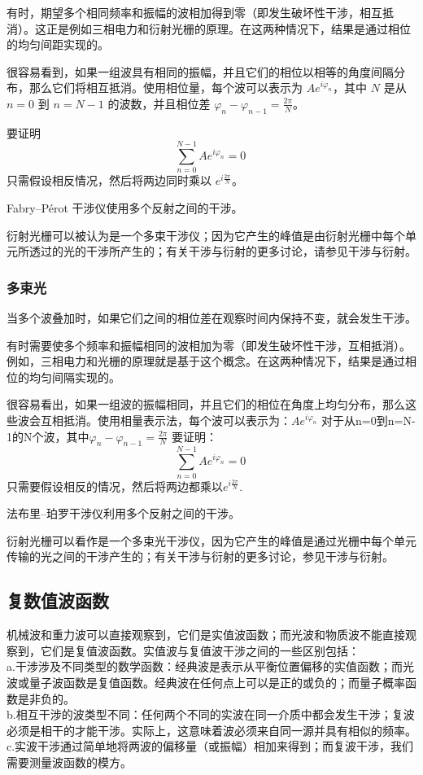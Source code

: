 有时，期望多个相同频率和振幅的波相加得到零（即发生破坏性干涉，相互抵消）。这正是例如三相电力和衍射光栅的原理。在这两种情况下，结果是通过相位的均匀间距实现的。

很容易看到，如果一组波具有相同的振幅，并且它们的相位以相等的角度间隔分布，那么它们将相互抵消。使用相位量，每个波可以表示为 \( Ae^{i\varphi_n} \)，其中 \( N \) 是从 \( n = 0 \) 到 \( n = N-1 \) 的波数，并且相位差 \( \varphi_n - \varphi_{n-1} = \frac{2\pi}{N} \)。

要证明
\[
\sum_{n=0}^{N-1} A e^{i\varphi_n} = 0~
\]
只需假设相反情况，然后将两边同时乘以 \( e^{i \frac{2\pi}{N}} \)。

Fabry–Pérot 干涉仪使用多个反射之间的干涉。

衍射光栅可以被认为是一个多束干涉仪；因为它产生的峰值是由衍射光栅中每个单元所透过的光的干涉所产生的；有关干涉与衍射的更多讨论，请参见干涉与衍射。
\subsubsection{多束光}
当多个波叠加时，如果它们之间的相位差在观察时间内保持不变，就会发生干涉。

有时需要使多个频率和振幅相同的波相加为零（即发生破坏性干涉，互相抵消）。例如，三相电力和光栅的原理就是基于这个概念。在这两种情况下，结果是通过相位的均匀间隔实现的。

很容易看出，如果一组波的振幅相同，并且它们的相位在角度上均匀分布，那么这些波会互相抵消。使用相量表示法，每个波可以表示为：\(\displaystyle Ae^{i\varphi _{n}}\)
对于从n=0到n=N-1的N个波，其中\(\displaystyle \varphi _{n}-\varphi _{n-1}={\frac {2\pi }{N}}\)
要证明：
\[
\displaystyle \sum_{n=0}^{N-1}Ae^{i\varphi _{n}}=0~
\]
只需要假设相反的情况，然后将两边都乘以\(\displaystyle e^{i{\frac {2\pi }{N}}}.\)

法布里–珀罗干涉仪利用多个反射之间的干涉。

衍射光栅可以看作是一个多束光干涉仪，因为它产生的峰值是通过光栅中每个单元传输的光之间的干涉产生的；有关干涉与衍射的更多讨论，参见干涉与衍射。
\subsection{复数值波函数}

机械波和重力波可以直接观察到，它们是实值波函数；而光波和物质波不能直接观察到，它们是复值波函数。实值波与复值波干涉之间的一些区别包括：\\
a.干涉涉及不同类型的数学函数：经典波是表示从平衡位置偏移的实值函数；而光波或量子波函数是复值函数。经典波在任何点上可以是正的或负的；而量子概率函数是非负的。\\
b.相互干涉的波类型不同：任何两个不同的实波在同一介质中都会发生干涉；复波必须是相干的才能干涉。实际上，这意味着波必须来自同一源并具有相似的频率。\\
c.实波干涉通过简单地将两波的偏移量（或振幅）相加来得到；而复波干涉，我们需要测量波函数的模方。\\
